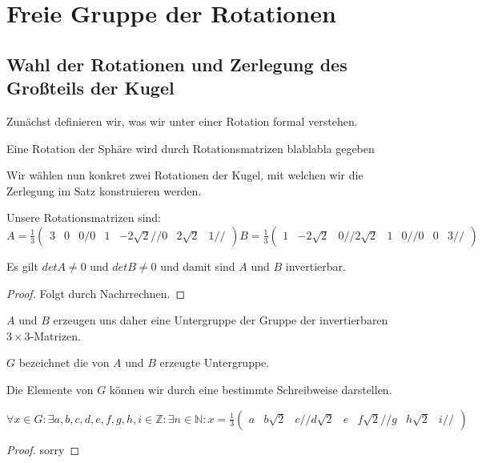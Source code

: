 \chapter{Freie Gruppe der Rotationen}


\section{Wahl der Rotationen und Zerlegung des Großteils der Kugel}

Zunächst definieren wir, was wir unter einer Rotation formal verstehen.
\begin{definition}[Rotationsmatrix]\label{def:rot}
Eine Rotation der Sphäre wird durch Rotationsmatrizen blablabla gegeben
\end{definition}


Wir wählen nun konkret zwei Rotationen der Kugel, mit welchen wir die Zerlegung im Satz konstruieren werden.
\begin{definition}\label{def:konk_rot}
Unsere Rotationsmatrizen sind: 
$A=\frac{1}{3}\begin{pmatrix} 3 & 0 & 0 /
                              0 & 1 & -2\sqrt{2} //
                              0 & 2\sqrt{2} & 1 //
\end{pmatrix}
B=\frac{1}{3}\begin{pmatrix} 1 & -2\sqrt{2} & 0 //
                             2\sqrt{2} & 1 & 0 //
                             0 & 0 & 3 //
\end{pmatrix}$
\end{definition}

\begin{lemma} \label{lemma:a_b_invertierbar}
Es gilt $det A\neq 0$ und $det B\neq 0$ und damit sind $A$ und $B$ invertierbar.
\end{lemma}
\begin{proof} 
Folgt durch Nachrrechnen.
\end{proof}

$A$ und $B$ erzeugen uns daher eine Untergruppe der Gruppe der invertierbaren $3\times3$-Matrizen.
\begin{definition}\label{def:konk_rot_erzeugt}
$G$ bezeichnet die von $A$ und $B$ erzeugte Untergruppe.
\end{definition}

Die Elemente von $G$ können wir durch eine bestimmte Schreibweise darstellen.
\begin{lemma}\label{lem:darst_von_rot_matrix}
$\forall x\in G:\exists a,b,c,d,e,f,g,h,i\in\mathbb{Z}:\exists n\in\mathbb{N}: x=\frac{1}{3}\begin{pmatrix} a & b\sqrt{2} & c //
                                                                                                            d\sqrt{2} & e & f\sqrt{2} //
                                                                                                            g & h\sqrt{2} & i //
\end{pmatrix}$ 
\end{lemma}
\begin{proof}
sorry
\end{proof}

